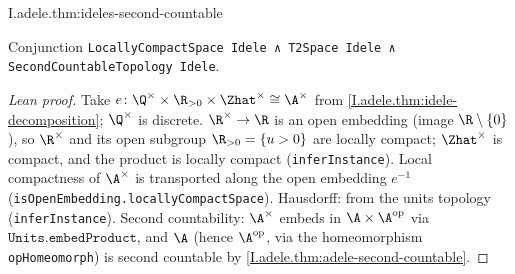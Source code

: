 \begin{theorem}
\end{theorem}
\begin{tfformal}{I.adele.thm:ideles-second-countable}
\begin{tffidelity}
Conjunction \texttt{LocallyCompactSpace Idele ∧ T2Space Idele ∧ SecondCountableTopology Idele}.
\end{tffidelity}
\end{tfformal}
\begin{proof}[Lean proof]
Take $e\colon\Q^\times\times\R_{>0}\times\Zhat^\times\cong\A^\times$ from \cref{I.adele.thm:idele-decomposition}; $\Q^\times$ is discrete. $\R^\times\to\R$ is an open embedding (image $\R\setminus\{0\}$), so $\R^\times$ and its open subgroup $\R_{>0}=\{u>0\}$ are locally compact; $\Zhat^\times$ is compact, and the product is locally compact (\texttt{inferInstance}). Local compactness of $\A^\times$ is transported along the open embedding $e^{-1}$ (\texttt{isOpenEmbedding.locallyCompactSpace}). Hausdorff: from the units topology (\texttt{inferInstance}). Second countability: $\A^\times$ embeds in $\A\times\A^{\mathrm{op}}$ via $\texttt{Units.embedProduct}$, and $\A$ (hence $\A^{\mathrm{op}}$, via the homeomorphism \texttt{opHomeomorph}) is second countable by \cref{I.adele.thm:adele-second-countable}.
\end{proof}

